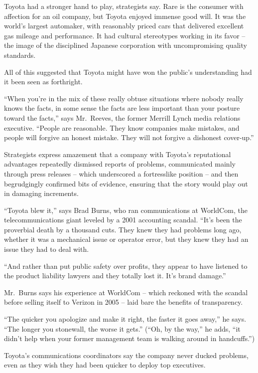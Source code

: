 ﻿\documentclass[12pt]{article}
\begin{document}
Toyota had a stronger hand to play, strategists say. Rare is the consumer with affection for an oil
company, but Toyota enjoyed immense good will. It was the world's largest automaker, with reasonably
priced cars that delivered excellent gas mileage and performance. It had cultural stereotypes
working in its favor -- the image of the disciplined Japanese corporation with uncompromising
quality standards.

All of this suggested that Toyota might have won the public's understanding had it been seen as
forthright.

``When you're in the mix of these really obtuse situations where nobody really knows the facts, in
some sense the facts are less important than your posture toward the facts,'' says Mr.~Reeves, the
former Merrill Lynch media relations executive. ``People are reasonable. They know companies make
mistakes, and people will forgive an honest mistake. They will not forgive a dishonest cover-up.''

Strategists express amazement that a company with Toyota's reputational advantages repeatedly
dismissed reports of problems, communicated mainly through press releases -- which underscored a
fortresslike position -- and then begrudgingly confirmed bits of evidence, ensuring that the story
would play out in damaging increments.

``Toyota blew it,'' says Brad Burns, who ran communications at WorldCom, the telecommunications
giant leveled by a 2001 accounting scandal. ``It's been the proverbial death by a thousand cuts.
They knew they had problems long ago, whether it was a mechanical issue or operator error, but they
knew they had an issue they had to deal with.

``And rather than put public safety over profits, they appear to have listened to the product
liability lawyers and they totally lost it. It's brand damage.''

Mr.~Burns says his experience at WorldCom -- which reckoned with the scandal before selling itself
to Verizon in 2005 -- laid bare the benefits of transparency.

``The quicker you apologize and make it right, the faster it goes away,'' he says. ``The longer you
stonewall, the worse it gets.'' (``Oh, by the way,'' he adds, ``it didn't help when your former
management team is walking around in handcuffs.'')

Toyota's communications coordinators say the company never ducked problems, even as they wish they
had been quicker to deploy top executives.
\end{document}

